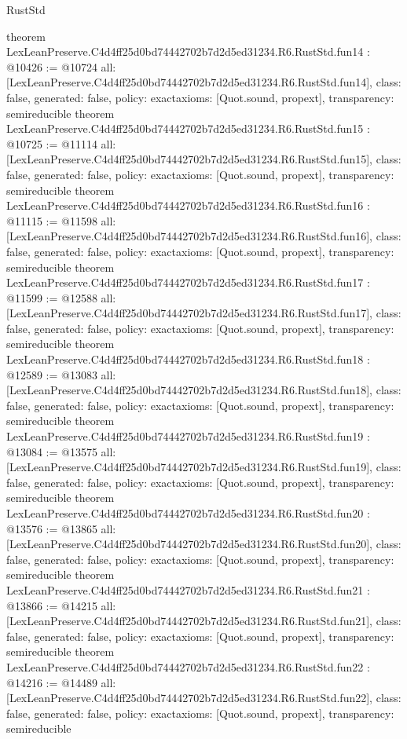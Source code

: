 \begin{lexlean}{RustStd}
\begin{coremodule}
{}
theorem LexLeanPreserve.C4d4ff25d0bd74442702b7d2d5ed31234.R6.RustStd.fun14 : @10426 := @10724 {
  all: [LexLeanPreserve.C4d4ff25d0bd74442702b7d2d5ed31234.R6.RustStd.fun14],
  class: false,
  generated: false,
  policy: exact{axioms: [Quot.sound, propext]},
  transparency: semireducible
}
theorem LexLeanPreserve.C4d4ff25d0bd74442702b7d2d5ed31234.R6.RustStd.fun15 : @10725 := @11114 {
  all: [LexLeanPreserve.C4d4ff25d0bd74442702b7d2d5ed31234.R6.RustStd.fun15],
  class: false,
  generated: false,
  policy: exact{axioms: [Quot.sound, propext]},
  transparency: semireducible
}
theorem LexLeanPreserve.C4d4ff25d0bd74442702b7d2d5ed31234.R6.RustStd.fun16 : @11115 := @11598 {
  all: [LexLeanPreserve.C4d4ff25d0bd74442702b7d2d5ed31234.R6.RustStd.fun16],
  class: false,
  generated: false,
  policy: exact{axioms: [Quot.sound, propext]},
  transparency: semireducible
}
theorem LexLeanPreserve.C4d4ff25d0bd74442702b7d2d5ed31234.R6.RustStd.fun17 : @11599 := @12588 {
  all: [LexLeanPreserve.C4d4ff25d0bd74442702b7d2d5ed31234.R6.RustStd.fun17],
  class: false,
  generated: false,
  policy: exact{axioms: [Quot.sound, propext]},
  transparency: semireducible
}
theorem LexLeanPreserve.C4d4ff25d0bd74442702b7d2d5ed31234.R6.RustStd.fun18 : @12589 := @13083 {
  all: [LexLeanPreserve.C4d4ff25d0bd74442702b7d2d5ed31234.R6.RustStd.fun18],
  class: false,
  generated: false,
  policy: exact{axioms: [Quot.sound, propext]},
  transparency: semireducible
}
theorem LexLeanPreserve.C4d4ff25d0bd74442702b7d2d5ed31234.R6.RustStd.fun19 : @13084 := @13575 {
  all: [LexLeanPreserve.C4d4ff25d0bd74442702b7d2d5ed31234.R6.RustStd.fun19],
  class: false,
  generated: false,
  policy: exact{axioms: [Quot.sound, propext]},
  transparency: semireducible
}
theorem LexLeanPreserve.C4d4ff25d0bd74442702b7d2d5ed31234.R6.RustStd.fun20 : @13576 := @13865 {
  all: [LexLeanPreserve.C4d4ff25d0bd74442702b7d2d5ed31234.R6.RustStd.fun20],
  class: false,
  generated: false,
  policy: exact{axioms: [Quot.sound, propext]},
  transparency: semireducible
}
theorem LexLeanPreserve.C4d4ff25d0bd74442702b7d2d5ed31234.R6.RustStd.fun21 : @13866 := @14215 {
  all: [LexLeanPreserve.C4d4ff25d0bd74442702b7d2d5ed31234.R6.RustStd.fun21],
  class: false,
  generated: false,
  policy: exact{axioms: [Quot.sound, propext]},
  transparency: semireducible
}
theorem LexLeanPreserve.C4d4ff25d0bd74442702b7d2d5ed31234.R6.RustStd.fun22 : @14216 := @14489 {
  all: [LexLeanPreserve.C4d4ff25d0bd74442702b7d2d5ed31234.R6.RustStd.fun22],
  class: false,
  generated: false,
  policy: exact{axioms: [Quot.sound, propext]},
  transparency: semireducible
}
\end{coremodule}
\end{lexlean}
